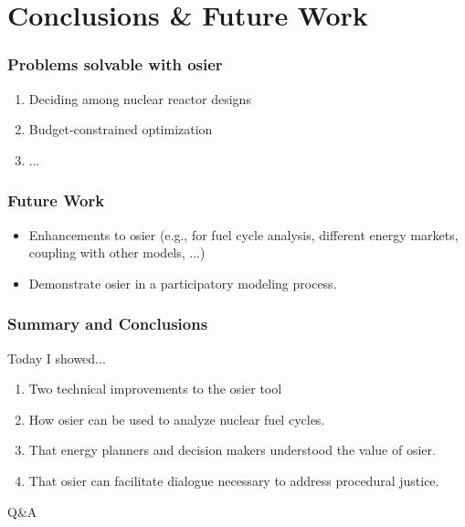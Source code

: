 \section{Conclusions \& Future Work}

\begin{frame}
    \frametitle{Problems solvable with \gls{osier}}

    \begin{enumerate}
        \item Deciding among nuclear reactor designs
        \item Budget-constrained optimization
        \item ...
    \end{enumerate}

\end{frame}

\begin{frame}
    \frametitle{Future Work}

    \begin{itemize}
        \item Enhancements to \gls{osier} (e.g., for fuel cycle analysis, different energy markets, coupling with
        other models, ...)
        \item Demonstrate \gls{osier} in a participatory modeling process.
    \end{itemize}
\end{frame}


\begin{frame}
    \frametitle{Summary and Conclusions}
    Today I showed... 
    \begin{enumerate}
        \item Two technical improvements to the \gls{osier} tool
        \item How \gls{osier} can be used to analyze nuclear fuel cycles.
        \item That energy planners and decision makers understood the value of \gls{osier}.
        \item That \gls{osier} can facilitate dialogue necessary to address procedural justice.
    \end{enumerate}
\end{frame}


\begin{frame}

    Q\&A
    
\end{frame}